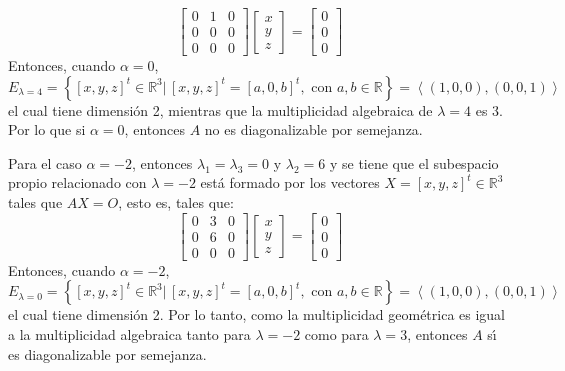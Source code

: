 \begin{solucion}
\begin{enumerate}[$a$)]
\begin{equation*}
\begin{bmatrix}
    0 & 1 & 0 \\
    0 & 0 & 0 \\
    0 & 0 & 0 
   \end{bmatrix}
   \begin{bmatrix}
    x \\ y \\ z
   \end{bmatrix}
   =
   \begin{bmatrix}
    0 \\ 0 \\ 0
   \end{bmatrix}
  \end{equation*}
  Entonces, cuando $\alpha=0$,
  \begin{equation*}
   E_{\lambda=4} = \left\{ [x,y,z]^t\in\mathbb{R}^3 |\, [x,y,z]^t = [a, 0, b]^t, \text{ con } a,b\in\mathbb{R} \right\} = \left< (1,0,0), (0,0,1) \right>
  \end{equation*}
  el cual tiene dimensi\'on 2, mientras que la multiplicidad algebraica de $\lambda=4$ es 3. Por lo que si $\alpha = 0$, entonces $A$ no es diagonalizable por semejanza.
  \par 
  Para el caso $\alpha =  -2$, entonces $\lambda_1 = \lambda_3 = 0$ y $\lambda_2 = 6$ y se tiene que el subespacio propio relacionado con $\lambda = -2$ est\'a formado por los vectores $X = [x,y,z]^t \in \mathbb{R}^3$ tales que $AX = O$, esto es, tales que:
  \begin{equation*}
   \begin{bmatrix}
    0 & 3 & 0 \\
    0 & 6 & 0 \\
    0 & 0 & 0 
   \end{bmatrix}
   \begin{bmatrix}
    x \\ y \\ z
   \end{bmatrix}
   =
   \begin{bmatrix}
    0 \\ 0 \\ 0
   \end{bmatrix}
  \end{equation*}
  Entonces, cuando $\alpha=-2$,
  \begin{equation*}
   E_{\lambda= 0} = \left\{ [x,y,z]^t \in \mathbb{R}^3 |\, [x,y,z]^t = [a,0,b]^t, \text{ con } a,b\in\mathbb{R} \right\} = \left<(1,0,0), (0,0,1)\right>
  \end{equation*}
  el cual tiene dimensi\'on 2. Por lo tanto, como la multiplicidad geom\'etrica es igual a la multiplicidad algebraica tanto para $\lambda = -2$ como para $\lambda = 3$, entonces $A$ s\'{\i} es diagonalizable por semejanza.

\end{enumerate}
\end{solucion}

